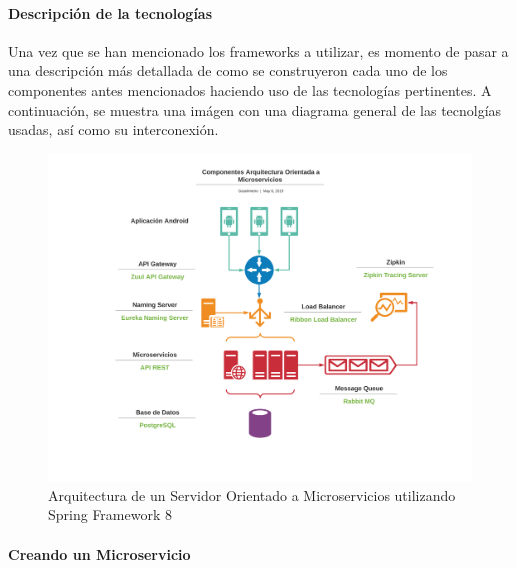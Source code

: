 \paragraph{Descripción de la tecnologías} Una vez que se han mencionado los frameworks a utilizar, es momento de pasar a una descripción más detallada de como se construyeron cada uno de los componentes antes mencionados haciendo uso de las tecnologías pertinentes. A continuación, se muestra una imágen con una diagrama general de las tecnolgías usadas, así como su interconexión.

\begin{figure}[H]
	\centering
	\includegraphics[scale=.14]{Capitulo5/software/submodulos/servidor/images/arquitectura.png}
	\caption{Arquitectura de un Servidor Orientado a Microservicios utilizando Spring Framework 8}
	\label{fig:arquitecura_servidor}
\end{figure}

\paragraph{Creando un Microservicio}

